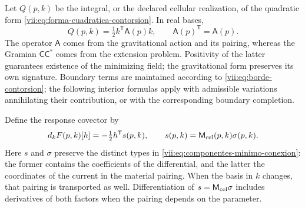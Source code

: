 Let \(Q(p,k)\) be the integral, or the declared cellular realization, of
the quadratic form
\eqref{vii:eq:forma-cuadratica-contorsion}. In real bases,
\begin{equation}
 Q(p,k)=\tfrac12 k^{\mathsf T}\mathsf A(p)k,
 \qquad \mathsf A(p)^{\mathsf T}=\mathsf A(p).
 \label{vii:eq:cuadratica-celular-contorsion}
\end{equation}
The operator \(\mathsf A\) comes from the gravitational action and
its pairing, whereas the Gramian
\(\mathsf C\mathsf C^*\) comes from the extension problem.
Positivity of the latter guarantees existence of the minimizing
field; the gravitational form preserves its own signature.
Boundary terms are maintained according to
\eqref{vii:eq:borde-contorsion}; the following interior formulas
apply with admissible variations annihilating their contribution, or
with the corresponding boundary completion.

Define the response covector by
\begin{equation}
 d_kF(p,k)[h]= -\tfrac12 h^{\mathsf T}s(p,k),
 \qquad s(p,k)=\mathsf M_{\rm cel}(p,k)\sigma(p,k).
 \label{vii:eq:covector-torsional-minimo}
\end{equation}
Here \(s\) and \(\sigma\) preserve the distinct types in
\eqref{vii:eq:componentes-minimo-conexion}: the former contains the
coefficients of the differential, and the latter the coordinates of the
current in the material pairing. When the basis in \(k\)
changes, that pairing is transported as well. Differentiation of
\(s=\mathsf M_{\rm cel}\sigma\) includes derivatives of both
factors when the pairing depends on the parameter.

